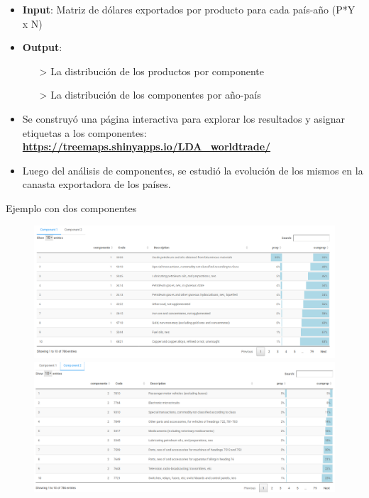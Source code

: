 \documentclass[compress]{beamer}
\begin{document}
\begin{frame}

\begin{itemize}[label=\faRebel]
\item \textbf{Input}: Matriz de dólares exportados por producto para cada país-año (P*Y x N)
\item \textbf{Output}:
\begin{itemize}
\item[>] La distribución de los productos por componente
\item[>] La distribución de los componentes por año-país
\end{itemize}

\item Se construyó una página interactiva para explorar los resultados y asignar etiquetas a los componentes: \textbf{\url{https://treemaps.shinyapps.io/LDA_worldtrade/}}
\item Luego del análisis de componentes, se estudió la evolución de los mismos en la canasta exportadora de los países.

\end{itemize}
\end{frame}


\begin{frame}
\tiny Ejemplo con dos componentes
\begin{figure}
\centering
\includegraphics[width=0.8\linewidth]{comp1k2}
\includegraphics[width=0.8\linewidth]{comp2k2}	
\end{figure}

\end{frame}
\end{document}
